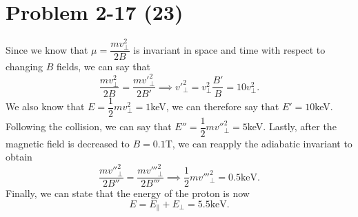 \section*{Problem 2-17 (23)}
\label{sec:2-17}
Since we know that \(\mu = \dfrac{mv_\perp^2}{2B} \) is invariant in space and time with respect to changing \(B\) fields, we can say that
\begin{equation*}
	\dfrac{mv_{\perp}^2}{2B} = \dfrac{m{v'}_{\perp}^{2}}{2B'} \implies {v'}_\perp^2 = v_\perp^2\dfrac{B'}{B} = 10v_\perp^2.
\end{equation*}
We also know that \(E = \dfrac{1}{2}mv_\perp^2 = 1 \)keV, we can therefore say that \(E' = 10\)keV. Following the collision, we can say that \(E'' = \dfrac{1}{2}m{v''}_\perp^2 = 5\)keV. Lastly, after the magnetic field is decreased to \(B = 0.1\)T, we can reapply the adiabatic invariant to obtain
\begin{equation*}
	\dfrac{m{v''}_{\perp}^2}{2B''} = \dfrac{m{v'''}_{\perp}^{2}}{2B'''} \implies \dfrac{1}{2}m{v'''}_\perp^2 = 0.5\text{keV}.
\end{equation*}
Finally, we can state that the energy of the proton is now
\begin{equation*}
	E = E_\parallel + E_\perp = 5.5\text{keV}.
\end{equation*}




